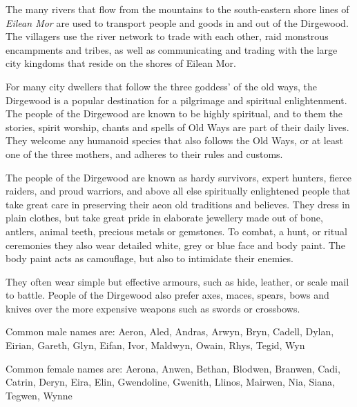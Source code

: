 The many rivers that flow from the mountains to the south-eastern shore lines of
\emph{Eilean Mor} are used to transport people and goods in and out of the
Dirgewood. The villagers use the river network to trade with each other, raid
monstrous encampments and tribes, as well as communicating and trading with
the large city kingdoms that reside on the shores of Eilean Mor.

For many city dwellers that follow the three goddess' of the old ways, the
Dirgewood is a popular destination for a pilgrimage and spiritual
enlightenment. The people of the Dirgewood are known to be highly spiritual,
and to them the stories, spirit worship, chants and spells of Old Ways are
part of their daily lives. They welcome any humanoid species that also follows
the Old Ways, or at least one of the three mothers, and adheres to their rules
and customs.

The people of the Dirgewood are known as hardy survivors, expert hunters,
fierce raiders, and proud warriors, and above all else spiritually enlightened
people that take great care in preserving their aeon old traditions and
believes. They dress in plain clothes, but take great pride in elaborate
jewellery made out of bone, antlers, animal teeth, precious metals or
gemstones. To combat, a hunt, or ritual ceremonies they also wear detailed
white, grey or blue face and body paint. The body paint acts as camouflage,
but also to intimidate their enemies.

They often wear simple but effective armours, such as hide, leather, or
scale mail to battle. People of the Dirgewood also prefer axes, maces,
spears, bows and knives over the more expensive weapons such as swords or
crossbows.

Common male names are: Aeron, Aled, Andras, Arwyn, Bryn, Cadell, Dylan,
Eirian, Gareth, Glyn, Eifan, Ivor, Maldwyn, Owain, Rhys, Tegid, Wyn

Common female names are: Aerona, Anwen, Bethan, Blodwen, Branwen, Cadi,
Catrin, Deryn, Eira, Elin, Gwendoline, Gwenith, Llinos, Mairwen, Nia,
Siana, Tegwen, Wynne
